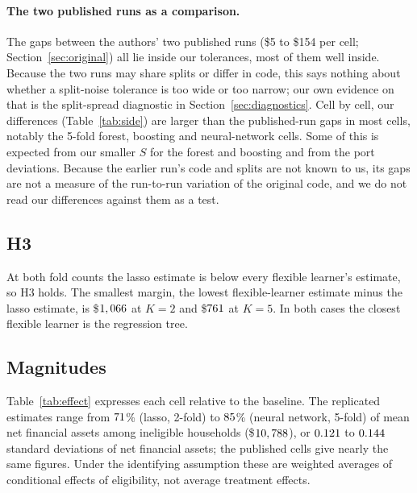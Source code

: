 \documentclass[11pt]{article}
\begin{document}
\paragraph{The two published runs as a comparison.} The gaps between the authors' two
published runs (\$5 to \$154 per cell; Section~\ref{sec:original}) all lie inside our
tolerances, most of them well inside. Because the two runs may share splits or differ
in code, this says nothing about whether a split-noise tolerance is too wide or too
narrow; our own evidence on that is the split-spread diagnostic in
Section~\ref{sec:diagnostics}. Cell by cell, our differences (Table~\ref{tab:side}) are larger than the
published-run gaps in most cells, notably the 5-fold forest, boosting and neural-network
cells. Some of this is expected from our smaller $S$ for the forest and boosting and from
the port deviations. Because the earlier run's code and splits are not known to us, its gaps
are not a measure of the run-to-run variation of the original code, and we do not read
our differences against them as a test.

\subsection{H3}

At both fold counts the lasso estimate is below every flexible learner's estimate, so
H3 holds. The smallest margin, the lowest flexible-learner estimate minus the lasso
estimate, is \$$1,066$ at $K = 2$ and \$$761$ at $K = 5$. In
both cases the closest flexible learner is the regression tree.

\subsection{Magnitudes}

Table~\ref{tab:effect} expresses each cell relative to the baseline. The replicated
estimates range from $71$\% (lasso, 2-fold) to $85$\%
(neural network, 5-fold) of mean net financial assets among ineligible households
(\$$10,788$), or $0.121$ to $0.144$ standard deviations of
net financial assets; the published cells give nearly the same figures. Under the
identifying assumption these are weighted averages of conditional effects of eligibility,
not average treatment effects.
\end{document}
